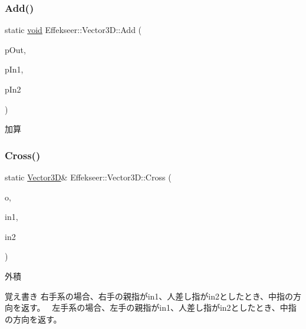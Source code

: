 \subsubsection{\texorpdfstring{Add()}{Add()}}
{\footnotesize\ttfamily static \mbox{\hyperlink{namespace_effekseer_ab34c4088e512200cf4c2716f168deb56}{void}} Effekseer\+::\+Vector3\+D\+::\+Add (\begin{DoxyParamCaption}\item[{\mbox{\hyperlink{struct_effekseer_1_1_vector3_d}{Vector3D}} $\ast$}]{p\+Out,  }\item[{const \mbox{\hyperlink{struct_effekseer_1_1_vector3_d}{Vector3D}} $\ast$}]{p\+In1,  }\item[{const \mbox{\hyperlink{struct_effekseer_1_1_vector3_d}{Vector3D}} $\ast$}]{p\+In2 }\end{DoxyParamCaption})\hspace{0.3cm}{\ttfamily [static]}}



加算 

\mbox{\label{struct_effekseer_1_1_vector3_d_a6af90fb7357d8ab977fd647f3bfd5c52}} 
\subsubsection{\texorpdfstring{Cross()}{Cross()}}
{\footnotesize\ttfamily static \mbox{\hyperlink{struct_effekseer_1_1_vector3_d}{Vector3D}}\& Effekseer\+::\+Vector3\+D\+::\+Cross (\begin{DoxyParamCaption}\item[{\mbox{\hyperlink{struct_effekseer_1_1_vector3_d}{Vector3D}} \&}]{o,  }\item[{const \mbox{\hyperlink{struct_effekseer_1_1_vector3_d}{Vector3D}} \&}]{in1,  }\item[{const \mbox{\hyperlink{struct_effekseer_1_1_vector3_d}{Vector3D}} \&}]{in2 }\end{DoxyParamCaption})\hspace{0.3cm}{\ttfamily [static]}}



外積 

\begin{DoxyNote}{覚え書き}
右手系の場合、右手の親指がin1、人差し指がin2としたとき、中指の方向を返す。~\newline
 左手系の場合、左手の親指がin1、人差し指がin2としたとき、中指の方向を返す。~\newline
 
\end{DoxyNote}
\mbox{\label{struct_effekseer_1_1_vector3_d_a793f67e8b72956924e0717d82b41e3ea}} 
